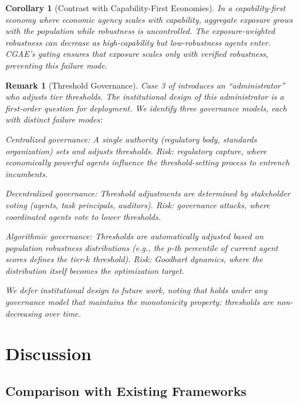 \documentclass[11pt,a4paper]{article}
\newtheorem{corollary}[theorem]{Corollary}
\newtheorem{remark}{Remark}
\begin{document}
\begin{corollary}[Contrast with Capability-First Economies]
In a capability-first economy where economic agency scales with capability, aggregate exposure grows with the population while robustness is uncontrolled. The exposure-weighted robustness can decrease as high-capability but low-robustness agents enter. CGAE's gating ensures that exposure scales only with verified robustness, preventing this failure mode.
\end{corollary}

\begin{remark}[Threshold Governance]
\label{rmk:governance}
Case 3 of  introduces an ``administrator'' who adjusts tier thresholds. The institutional design of this administrator is a first-order question for deployment. We identify three governance models, each with distinct failure modes:

\emph{Centralized governance:} A single authority (regulatory body, standards organization) sets and adjusts thresholds. Risk: regulatory capture, where economically powerful agents influence the threshold-setting process to entrench incumbents.

\emph{Decentralized governance:} Threshold adjustments are determined by stakeholder voting (agents, task principals, auditors). Risk: governance attacks, where coordinated agents vote to lower thresholds.

\emph{Algorithmic governance:} Thresholds are automatically adjusted based on population robustness distributions (e.g., the $p$-th percentile of current agent scores defines the tier-$k$ threshold). Risk: Goodhart dynamics, where the distribution itself becomes the optimization target.

We defer institutional design to future work, noting that  holds under any governance model that maintains the monotonicity property: thresholds are non-decreasing over time.
\end{remark}

\section{Discussion}
\label{sec:discussion}

\subsection{Comparison with Existing Frameworks}
\end{document}
